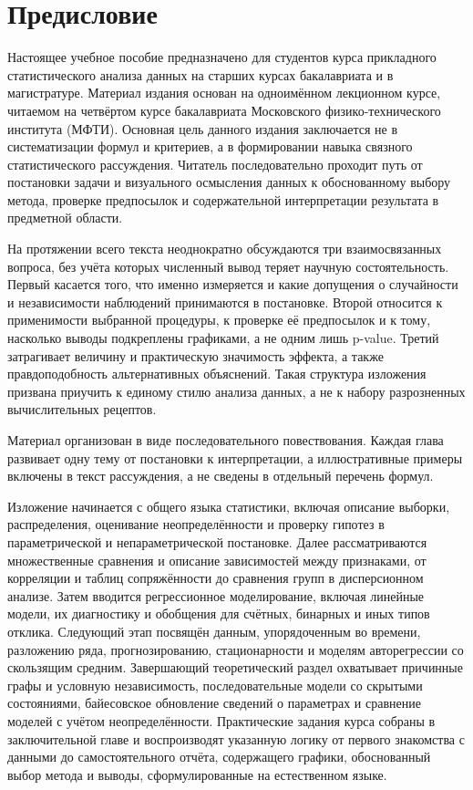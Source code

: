 \chapter*{Предисловие}

Настоящее учебное пособие предназначено для студентов курса прикладного статистического анализа данных на старших курсах бакалавриата и в магистратуре.
Материал издания основан на одноимённом лекционном курсе, читаемом на четвёртом курсе бакалавриата Московского физико-технического института (МФТИ).
Основная цель данного издания заключается не в систематизации формул и критериев, а в формировании навыка связного статистического рассуждения.
Читатель последовательно проходит путь от постановки задачи и визуального осмысления данных к обоснованному выбору метода, проверке предпосылок и содержательной интерпретации результата в предметной области.

На протяжении всего текста неоднократно обсуждаются три взаимосвязанных вопроса, без учёта которых численный вывод теряет научную состоятельность.
Первый касается того, что именно измеряется и какие допущения о случайности и независимости наблюдений принимаются в постановке.
Второй относится к применимости выбранной процедуры, к проверке её предпосылок и к тому, насколько выводы подкреплены графиками, а не одним лишь p-value.
Третий затрагивает величину и практическую значимость эффекта, а также правдоподобность альтернативных объяснений.
Такая структура изложения призвана приучить к единому стилю анализа данных, а не к набору разрозненных вычислительных рецептов.

Материал организован в виде последовательного повествования.
Каждая глава развивает одну тему от постановки к интерпретации, а иллюстративные примеры включены в текст рассуждения, а не сведены в отдельный перечень формул.

Изложение начинается с общего языка статистики, включая описание выборки, распределения, оценивание неопределённости и проверку гипотез в параметрической и непараметрической постановке.
Далее рассматриваются множественные сравнения и описание зависимостей между признаками, от корреляции и таблиц сопряжённости до сравнения групп в дисперсионном анализе.
Затем вводится регрессионное моделирование, включая линейные модели, их диагностику и обобщения для счётных, бинарных и иных типов отклика.
Следующий этап посвящён данным, упорядоченным во времени, разложению ряда, прогнозированию, стационарности и моделям авторегрессии со скользящим средним.
Завершающий теоретический раздел охватывает причинные графы и условную независимость, последовательные модели со скрытыми состояниями, байесовское обновление сведений о параметрах и сравнение моделей с учётом неопределённости.
Практические задания курса собраны в заключительной главе и воспроизводят указанную логику от первого знакомства с данными до самостоятельного отчёта, содержащего графики, обоснованный выбор метода и выводы, сформулированные на естественном языке.

